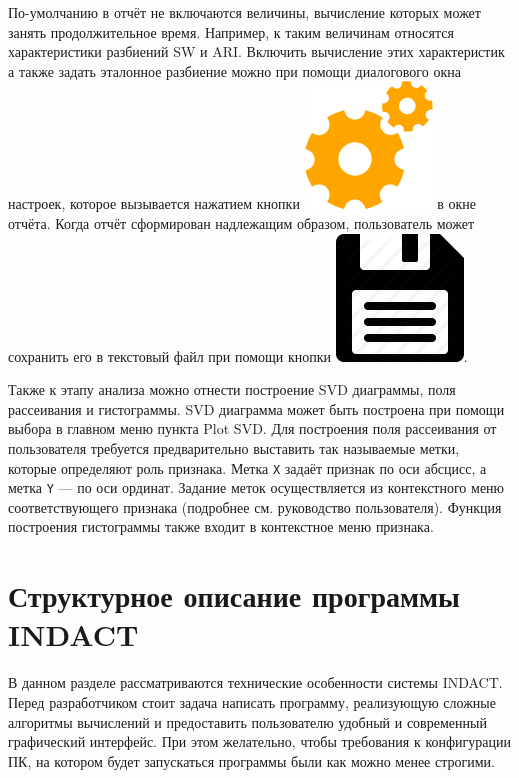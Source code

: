 \documentclass[12pt]{diploma}
\begin{document}
	По-умолчанию в отчёт не включаются величины, вычисление которых может занять продолжительное время. Например, к таким величинам относятся характеристики разбиений SW и ARI. Включить вычисление этих характеристик а также задать эталонное разбиение можно при помощи диалогового окна настроек, которое вызывается нажатием кнопки \includegraphics[scale=0.1]{img/settings} в окне отчёта. Когда отчёт сформирован надлежащим образом, пользователь может сохранить его в текстовый файл при помощи кнопки \includegraphics[scale=0.1]{img/save}.
	
	Также к этапу анализа можно отнести построение SVD диаграммы, поля рассеивания и гистограммы. SVD диаграмма может быть построена при помощи выбора в главном меню пункта Plot \textrightarrow SVD. Для построения поля рассеивания от пользователя требуется предварительно выставить так называемые метки, которые определяют роль признака. Метка \texttt{X} задаёт признак по оси абсцисс, а метка \texttt{Y} --- по оси ординат. Задание меток осуществляется из контекстного меню соответствующего признака (подробнее см. руководство пользователя). Функция построения гистограммы также входит в контекстное меню признака.
	
	\section{Структурное описание программы INDACT} \label{sec:structure}
	
	В данном разделе рассматриваются технические особенности системы INDACT. Перед разработчиком стоит задача написать программу, реализующую сложные алгоритмы вычислений и предоставить пользователю удобный и современный графический интерфейс. При этом желательно, чтобы требования к конфигурации ПК, на котором будет запускаться программы были как можно менее строгими. 
	
\end{document}
